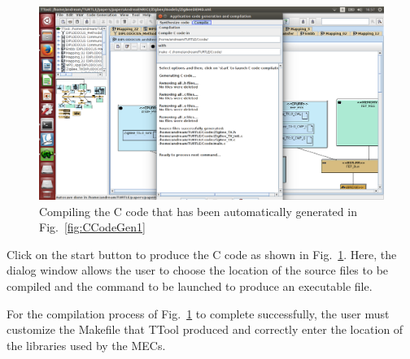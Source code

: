 \documentclass{llncs}
\newcommand{\screenshotsize}{1.0\textwidth}
\begin{document}
\begin{figure}[!htbp]
	\centering
 	\includegraphics[width=\screenshotsize]{figures/screenshot/CCodeGen2.png}
	\caption{Compiling the C code that has been automatically generated in Fig.~\ref{fig:CCodeGen1}}
	\label{fig:CCodeGen2}
\end{figure}

Click on the start button to produce the C code as shown in Fig.~\ref{fig:CCodeGen2}. Here, the dialog window allows the
user to choose the location of the source files to be compiled and the command to be launched to produce an executable
file.
%

%
For the compilation process of Fig.~\ref{fig:CCodeGen2} to complete successfully, the user must customize the Makefile
that TTool produced and correctly enter the location of the libraries used by the MECs.\\
%
\end{document}
